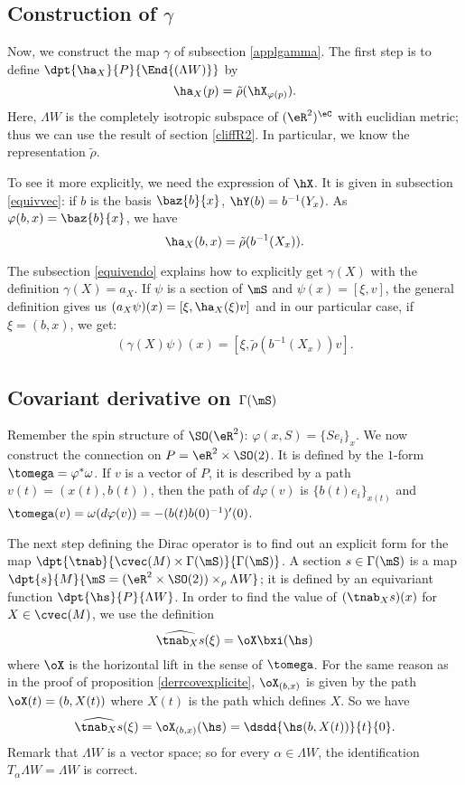 \subsection{Construction of \texorpdfstring{$\gamma$}{g}}

Now, we construct the map $\gamma$ of subsection \ref{applgamma}. The first step is to define $\dpt{\ha_X}{P}{\End{(\Lambda W )}}$ by
\[
\ha_X(p)=\tilde\rho(\hX_{\varphi(p)}).
\]
Here, $\Lambda W $ is the completely isotropic subspace of $(\eR^2)^{\eC}$ with euclidian metric; thus we can use the result of section \ref{cliffR2}. In particular, we know the representation $\tilde\rho$.

To see it more explicitly, we need the expression of $\hX$. It is given in subsection \ref{equivvec}: if $b$ is the basis $\baz{b}{x}$, $\hY(b)=b^{-1}(Y_x)$. As $\varphi(b,x)=\baz{b}{x}$, we have
\[
\ha_X(b,x)=\tilde\rho(b^{-1}(X_x)).
\]

The subsection \ref{equivendo} explains how to explicitly get $\gamma(X)$ with the definition $\gamma(X)=a_X$. If $\psi$ is a section of $\mS$ and $\psi(x)=[\xi,v]$, the general definition gives us $(a_X\psi)(x)=[\xi,\ha_X(\xi)v]$ and in our particular case, if $\xi=(b,x)$, we get:
\begin{eqnarray}
 \label{gammaX}(\gamma(X)\psi)(x)=[\xi,\tilde\rho(b^{-1}(X_x))v].
\end{eqnarray}

\subsection{Covariant derivative on \texorpdfstring{$\protect\Gamma(\mS)$}{S}}

Remember the spin structure of $\SO(\eR^2)$: $\varphi(x,S)=\{Se_i\}_x$. We now construct the connection on $P=\eR^2\times \SO(2)$. It is defined by the $1$-form $\tomega=\varphi^*\omega$. If $v$ is a vector of $P$, it is described by a path $v(t)=(x(t),b(t))$, then the path of $d\varphi(v)$ is $\{b(t)e_i\}_{x(t)}$ and $\tomega(v)=\omega(d\varphi(v))=-(b(t)b(0)^{-1})'(0)$.

The next step defining the Dirac operator is to find out an explicit form for the map $\dpt{\tnab}{\cvec(M)\times\Gamma(\mS)}{\Gamma(\mS)}$. A section $s\in\Gamma(\mS)$ is a map $\dpt{s}{M}{\mS=(\eR^2\times \SO(2))\times_{\rho}\Lambda W }$; it is defined by an equivariant function $\dpt{\hs}{P}{\Lambda W }$. In order to find the value of $(\tnab_Xs)(x)$ for $X\in\cvec(M)$, we use the definition
\[
 \widehat{\tnab_Xs}(\xi)=\oX\bxi(\hs)
\]
where $\oX$ is the horizontal lift in the sense of $\tomega$. For the same reason as in the proof of proposition \ref{derrcovexplicite}, $\oX_{(b,x)}$ is given by the path $\oX(t)=(b,X(t))$ where $X(t)$ is the path which defines $X$. So we have
\[
 \widehat{\tnab_Xs}(\xi)=\oX_{(b,x)}(\hs)=\dsdd{\hs(b,X(t))}{t}{0}.
\]
Remark that $\Lambda W $ is a vector space; so for every $\alpha\in\Lambda W $, the identification $T_{\alpha}\Lambda W =\Lambda W $ is correct.

